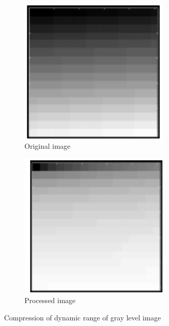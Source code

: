         \begin{figure}[h]
                \centering
                \begin{subfigure}[b]{0.46\textwidth}
                        \centering
                        \includegraphics[width=\textwidth,height=7cm]{chapiter1/figures/compresed-dynamique-range-01.png}
                        \caption{Original image}
                \end{subfigure}
                \hfill
                \begin{subfigure}[b]{0.46\textwidth}
                        \centering
                        \includegraphics[width=\textwidth,height=7cm]{chapiter1/figures/compresed-dynamique-range-02.png}
                        \caption{Processed image}
                \end{subfigure}
                \caption{Compression of dynamic range of gray level image}
                \label{fig:figure1.11}
        \end{figure}
        \vspace{2cm}
